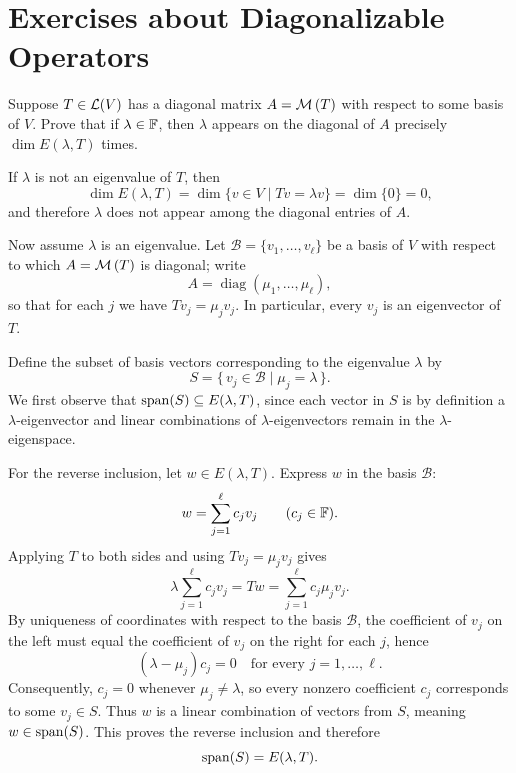 \section*{Exercises about Diagonalizable Operators}

\begin{xrcs}
  Suppose $T \in \mathcal{L}(V)$ has a diagonal matrix $A=\mathcal{M} \left(T\right)$ with respect to some basis of $V$. Prove that if $\lambda \in \mathbb{F}$, then $\lambda$ appears on the diagonal of $A$ precisely $\dim E (\lambda , T)$ times.

  \begin{xprf}
    If $\lambda$ is not an eigenvalue of $T$, then
    \begin{equation}
      \dim E(\lambda, T) = \dim \{v \in V \mid Tv = \lambda v\} = \dim \{0\} = 0,
    \end{equation}
    and therefore $\lambda$ does not appear among the diagonal entries of $A$.

    Now assume $\lambda$ is an eigenvalue. Let $\mathcal{B} = \{v_1, \dots, v_\ell\}$ be a basis of $V$ with respect to which $A = \mathcal{M} \left(T\right)$ is diagonal; write
    \begin{equation}
      A = \operatorname{diag}(\mu_1, \dots, \mu_\ell),
    \end{equation}
    so that for each $j$ we have $Tv_j = \mu_j v_j$. In particular, every $v_j$ is an eigenvector of $T$.

    Define the subset of basis vectors corresponding to the eigenvalue $\lambda$ by
    \begin{equation}
      S = \{\, v_j \in \mathcal{B} \mid \mu_j = \lambda \,\}.
    \end{equation}
    We first observe that $\operatorname{span} (S) \subseteq E(\lambda, T)$, since each vector in $S$ is by definition a $\lambda$-eigenvector and linear combinations of $\lambda$-eigenvectors remain in the $\lambda$-eigenspace.

    For the reverse inclusion, let $w \in E(\lambda, T)$. Express $w$ in the basis $\mathcal{B}$:
    \begin{equation}
      w = \sum_{j=1}^\ell c_j v_j \qquad (c_j \in \mathbb{F}).
    \end{equation}
    Applying $T$ to both sides and using $Tv_j = \mu_j v_j$ gives
    \begin{equation}
      \lambda \sum_{j=1}^\ell c_j v_j = Tw = \sum_{j=1}^\ell c_j \mu_j v_j.
    \end{equation}
    By uniqueness of coordinates with respect to the basis $\mathcal{B}$, the coefficient of $v_j$ on the left must equal the coefficient of $v_j$ on the right for each $j$, hence
    \begin{equation}
      (\lambda - \mu_j) c_j = 0 \quad \text{for every } j = 1, \dots, \ell.
    \end{equation}
    Consequently, $c_j = 0$ whenever $\mu_j \neq \lambda$, so every nonzero coefficient $c_j$ corresponds to some $v_j \in S$. Thus $w$ is a linear combination of vectors from $S$, meaning $w \in \operatorname{span} (S)$. This proves the reverse inclusion and therefore
    \begin{equation}
      \operatorname{span} (S) = E(\lambda, T).
    \end{equation}


\end{xprf}
\end{xrcs}
